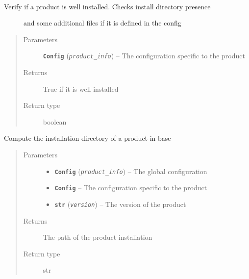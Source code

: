 \documentclass[a4paper,10pt,english]{sphinxmanual}
\begin{document}
\begin{fulllineitems}
\label{commands/apidoc/src:src.product.check_installation}~\begin{description}
\item[{Verify if a product is well installed. Checks install directory presence}] \leavevmode
and some additional files if it is defined in the config

\end{description}
\begin{quote}\begin{description}
\item[{Parameters}] \leavevmode
\textbf{\texttt{Config}} (\emph{\texttt{product\_info}}) -- The configuration specific to 
the product

\item[{Returns}] \leavevmode
True if it is well installed

\item[{Return type}] \leavevmode
boolean

\end{description}\end{quote}

\end{fulllineitems}


\begin{fulllineitems}
\label{commands/apidoc/src:src.product.get_base_install_dir}
Compute the installation directory of a product in base
\begin{quote}\begin{description}
\item[{Parameters}] \leavevmode\begin{itemize}
\item {} 
\textbf{\texttt{Config}} (\emph{\texttt{product\_info}}) -- The global configuration

\item {} 
\textbf{\texttt{Config}} -- The configuration specific to 
the product

\item {} 
\textbf{\texttt{str}} (\emph{\texttt{version}}) -- The version of the product

\end{itemize}

\item[{Returns}] \leavevmode
The path of the product installation

\item[{Return type}] \leavevmode
str

\end{description}\end{quote}

\end{fulllineitems}
\end{document}
